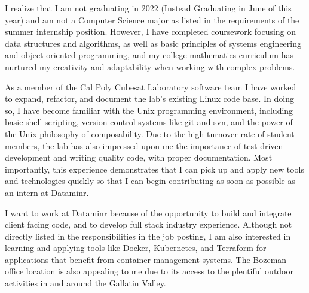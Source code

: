 \documentclass[a4paper, 11pt, sans]{moderncv}
\date{\today}
\begin{document}
\makelettertitle

I realize that I am not graduating in 2022 (Instead Graduating in June of this year) and am not a Computer Science major as listed in the requirements of the summer internship position. However, I have completed coursework focusing on data structures and algorithms, as well as basic principles of systems engineering and object oriented programming, and my college mathematics curriculum has nurtured my creativity and adaptability when working with complex problems.\newline

As a member of the Cal Poly Cubesat Laboratory software team I have worked to expand, refactor, and document the lab's existing Linux code base. In doing so, I have become familiar with the Unix programming environment, including basic shell scripting, version control systems like git and svn, and the power of the Unix philosophy of composability. Due to the high turnover rate of student members, the lab has also impressed upon me the importance of test-driven development and writing quality code, with proper documentation. Most importantly, this experience demonstrates that I can pick up and apply new tools and technologies quickly so that I can begin contributing as soon as possible as an intern at Dataminr.\newline

I want to work at Dataminr because of the opportunity to build and integrate client facing code, and to develop full stack industry experience. Although not directly listed in the responsibilities in the job posting, I am also interested in learning and applying tools like Docker, Kubernetes, and Terraform for applications that benefit from container management systems. The Bozeman office location is also appealing to me due to its access to the plentiful outdoor activities in and around the Gallatin Valley. \newline 

\makeletterclosing
\end{document}

